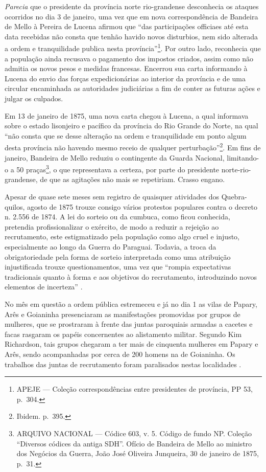 \begin{refsection}
\textit{Parecia} que o presidente da província norte rio-grandense desconhecia os ataques ocorridos no dia 3 de janeiro, uma vez que em nova correspondência de Bandeira de Mello à Pereira de Lucena afirmou que “das participações officiaes até esta data recebidas não consta que tenhão havido novos disturbios, nem sido alterada a ordem e tranquilidade publica nesta província”\footnote{APEJE --- Coleção correspondências entre presidentes de província, PP 53, p.~304.}. Por outro lado, reconhecia que a população ainda recusava o pagamento dos impostos criados, assim como não admitia os novos pesos e medidas francesas. Encerrou sua carta informando à Lucena do envio das forças expedicionárias ao interior da província e de uma circular encaminhada as autoridades judiciárias a fim de conter as futuras ações e julgar os culpados. 

Em 13 de janeiro de 1875, uma nova carta chegou à Lucena, a qual informava sobre o estado lisonjeiro e pacífico da província do Rio Grande do Norte, na qual “não consta que se desse alteração na ordem e tranquilidade em ponto algum desta província não havendo mesmo receio de qualquer perturbação”\footnote{Ibidem. p.~395.}. Em fins de janeiro, Bandeira de Mello reduziu o contingente da Guarda Nacional, limitando-o a 50 praças\footnote{ARQUIVO NACIONAL --- Códice 603, v. 5. Código de fundo NP. Coleção “Diversos códices da antiga SDH”. Ofício de Bandeira de Mello ao ministro dos Negócios da Guerra, João José Oliveira Junqueira, 30 de janeiro de 1875, p.~31.}, o que representava a certeza, por parte do presidente norte-rio-grandense, de que as agitações não mais se repetiriam. Crasso engano. 

Apesar de quase sete meses sem registro de quaisquer atividades dos Quebra-quilos, agosto de 1875 trouxe consigo vários protestos populares contra o decreto n. 2.556 de 1874. A lei do sorteio ou da cumbuca, como ficou conhecida, pretendia profissionalizar o exército, de modo a reduzir a rejeição ao recrutamento, este estigmatizado pela população como algo cruel e injusto, especialmente ao longo da Guerra do Paraguai. Todavia, a troca da obrigatoriedade pela forma de sorteio interpretada como uma atribuição injustificada trouxe questionamentos, uma vez que “rompia expectativas tradicionais quanto à forma e aos objetivos do recrutamento, introduzindo novos elementos de incerteza” \cite[p.~270]{Mendes1999}.

No mês em questão a ordem pública estremeceu e já no dia 1 as vilas de Papary, Arês e Goianinha presenciaram as manifestações promovidas por grupos de mulheres, que se prostraram à frente das juntas paroquiais armadas a cacetes e facas rasgaram os papéis concernentes ao alistamento militar. Segundo Kim Richardson, tais grupos chegaram a ter mais de cinquenta mulheres em Papary e Arês, sendo acompanhadas por cerca de 200 homens na de Goianinha. Os trabalhos das juntas de recrutamento foram paralisados nestas localidades \cite[p.~133]{Richardson2008}.


\end{refsection}
